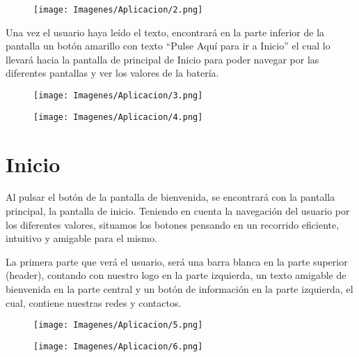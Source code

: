         \begin{figure} [H]
            \centering
            \texttt{[image: Imagenes/Aplicacion/2.png]}
        \end{figure}

        Una vez el usuario haya leído el texto, encontrará en la parte inferior de la pantalla un botón amarillo con texto “Pulse Aquí para ir a Inicio” el cual lo llevará hacia la pantalla de principal de Inicio para poder navegar por las diferentes pantallas y ver los valores de la batería.\par

        \begin{figure} [H]
            \centering
            \texttt{[image: Imagenes/Aplicacion/3.png]}
        \end{figure}

        \begin{figure} [H]
            \centering
            \texttt{[image: Imagenes/Aplicacion/4.png]}
        \end{figure}

    \section{Inicio}
        Al pulsar el botón de la pantalla de bienvenida, se encontrará con la pantalla principal, la pantalla de inicio. Teniendo en cuenta la navegación del usuario por los diferentes valores, situamos los botones pensando en un recorrido eficiente, intuitivo y amigable para el mismo.\par
        La primera parte que verá el usuario, será una barra blanca en la parte superior (header), contando con nuestro logo en la parte izquierda, un texto amigable de bienvenida en la parte central y un botón de información en la parte izquierda, el cual, contiene nuestras redes y contactos.

        \begin{figure} [H]
            \centering
            \texttt{[image: Imagenes/Aplicacion/5.png]}
        \end{figure}

        \begin{figure} [H]
            \centering
            \texttt{[image: Imagenes/Aplicacion/6.png]}
        \end{figure}

